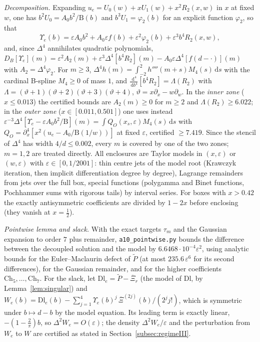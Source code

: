 \documentclass[11pt]{amsart}
\theoremstyle{definition}
\theoremstyle{remark}
\numberwithin{equation}{section}
\newcommand{\Xb}{\overline{\Xi}}
\newcommand{\dd}{\,\mathrm{d}}
\begin{document}
\emph{Decomposition.} Expanding $u_e=U_0(w)+xU_1(w)+x^2R_2(x,w)$ in $x$ at fixed $w$, one has $b^2U_0=A_0b^2/\mathrm B(b)$ and
$b^3U_1=\varphi_2(b)$ for an explicit function $\varphi_2$, so that
\[
\Upsilon_e(b)=\varepsilon A_0b^2+A_0\varepsilon f(b)+\varepsilon^2\varphi_2(b)+\varepsilon^3b^4R_2(x,w),
\]
and, since $\Delta^4$ annihilates quadratic polynomials,
$D_B[\Upsilon_e](m)=\varepsilon^2A_2(m)+\varepsilon^3\Delta^4[b^4R_2](m)-A_0\varepsilon\Delta^4[f(d-\cdot)](m)$ with $A_2=\Delta^4\varphi_2$. For $m\ge3$,
$\Delta^4h(m)=\int_{-2}^2h''''(m+s)M_4(s)\dd s$ with the cardinal B-spline $M_4\ge0$ of mass $1$, and
$\frac{\dd^4}{\dd b^4}[b^4R_2]=\Lambda(R_2)$ with $\Lambda=(\vartheta+1)(\vartheta+2)(\vartheta+3)(\vartheta+4)$, $\vartheta=x\partial_x-w\partial_w$. In the
\emph{inner zone} ($x\le0.013$) the certified bounds are $A_2(m)\ge0$ for $m\ge2$ and $\Lambda(R_2)\ge6.022$; in the \emph{outer zone}
($x\in[0.011,0.501]$) one uses instead $\varepsilon^{-3}\Delta^4[\Upsilon_e-\varepsilon A_0b^2/\mathrm B](m)=\int Q_O(x_s,\varepsilon)M_4(s)\dd s$ with
$Q_O=\partial_x^4[x^2(u_e-A_0/\mathrm B(1/w))]$ at fixed $\varepsilon$, certified $\ge7.419$. Since the stencil of $\Delta^4$ has width
$4/d\le0.002$, every $m$ is covered by one of the two zones; $m=1,2$ are treated directly. All enclosures are Taylor models in
$(x,\varepsilon)$ or $(w,\varepsilon)$ with $\varepsilon\in[0,1/2001]$: thin centre jets of the model root (Krawczyk iteration, then
implicit differentiation degree by degree), Lagrange remainders from jets over the full box, special functions (polygamma
and Binet functions, Pochhammer sums with rigorous tails) by interval series. For boxes with $x>0.42$ the exactly
antisymmetric coefficients are divided by $1-2x$ before enclosing (they vanish at $x=\frac12$).

\emph{Pointwise lemma and slack.} With the exact targets $\tau_m$ and the Gaussian expansion to order $7$ plus remainder,
\texttt{a10\_pointwise.py} bounds the difference between the decoupled solution and the model by $6.6468\cdot10^{-4}\varepsilon^2$,
using analytic bounds for the Euler--Maclaurin defect of $\tilde P$ (at most $235.6\,\varepsilon^6$ for its second differences), for
the Gaussian remainder, and for the higher coefficients $\mathrm{Ch}_5,\dots,\mathrm{Ch}_7$. For the slack, let
$\mathrm{Dl}_e=\tilde P-\Xb_r$ (the model of $\mathrm{Dl}$, by Lemma~\ref{lem:singular}) and
$W_e(b)=\mathrm{Dl}_e(b)-\sum_{j=1}^4\Upsilon_e(b)^j\,\Xb^{(2j)}(b)/(2^jj!)$, which is symmetric under $b\mapsto d-b$ by the model
equation. Its leading term is exactly linear, $-(1-\frac2\pi)b$, so $\Delta^2W_e=O(\varepsilon)$; the density
$\Delta^2W_e/\varepsilon$ and the perturbation from $W_e$ to $W$ are certified as stated in Section~\ref{subsec:regimeIII}.
\end{document}
